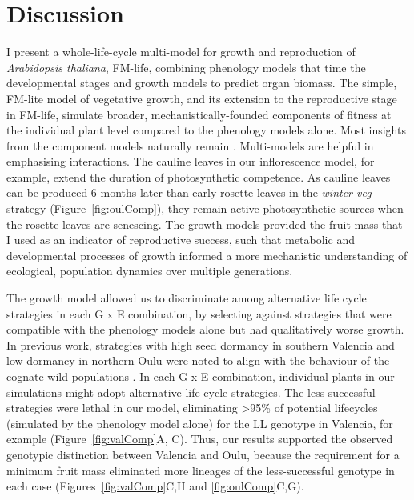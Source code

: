 \section{Discussion}
\label{sec:discussion}

I present a whole-life-cycle multi-model for growth and reproduction of
\emph{Arabidopsis thaliana}, FM-life, combining phenology models that time the
developmental stages and growth models to predict organ biomass. The simple,
FM-lite model of vegetative growth, and its extension to the reproductive stage
in FM-life, simulate broader, mechanistically-founded components of fitness at
the individual plant level compared to the phenology models alone. Most insights
from the component models naturally remain
\citep{rasse_leaf_2006,christophe_model-based_2008,
  wilczek_effects_2009,burghardt_modeling_2015}. Multi-models are helpful in
emphasising interactions. The cauline leaves in our inflorescence model, for
example, extend the duration of photosynthetic competence. As cauline leaves can
be produced 6 months later than early rosette leaves in the \emph{winter-veg}
strategy (Figure~\ref{fig:oulComp}), they remain active photosynthetic sources
\citep{earley_inflorescences_2009, leonardos_photosynthetic_2014} when the
rosette leaves are senescing. The growth models provided the fruit mass that I
used as an indicator of reproductive success, such that metabolic and
developmental processes of growth informed a more mechanistic understanding of
ecological, population dynamics over multiple generations.

The growth model allowed us to discriminate among alternative life cycle
strategies in each G x E combination, by selecting against strategies that were
compatible with the phenology models alone but had qualitatively worse
growth. In previous work, strategies with high seed dormancy in southern
Valencia and low dormancy in northern Oulu were noted to align with the
behaviour of the cognate wild populations \citep{atwell_genome-wide_2010,
  chiang_dog1_2011, mendez-vigo_altitudinal_2011, burghardt_data_2014}. In each
G x E combination, individual plants in our simulations might adopt alternative
life cycle strategies. The less-successful strategies were lethal in our model,
eliminating \textgreater{}95\% of potential lifecycles (simulated by the
phenology model alone) for the LL genotype in Valencia, for example
(Figure~\ref{fig:valComp}A, C). Thus, our results supported the observed
genotypic distinction between Valencia and Oulu, because the requirement for a
minimum fruit mass eliminated more lineages of the less-successful genotype in
each case (Figures~\ref{fig:valComp}C,H and \ref{fig:oulComp}C,G).

